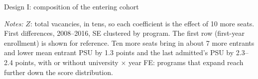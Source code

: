 \documentclass{beamer}
\begin{document}
\begin{frame}{Design I: composition of the entering cohort}
\centering
{}

\vspace{0.08cm}
\tiny
\resizebox{0.50\textwidth}{!}{}

\vspace{0.06cm}
\parbox{0.95\textwidth}{\tiny
\textit{Notes:} $Z$: total vacancies, in tens, so each coefficient is the effect of 10 more seats. First differences, 2008--2016,
SE clustered by program. The first row (first-year enrollment) is shown for reference.
Ten more seats bring in about 7 more entrants and lower mean entrant PSU by 1.3 points and the last admitted's PSU by 2.3--2.4 points,
with or without university $\times$ year FE: programs that expand reach further down the score distribution.}
\end{frame}
\end{document}
